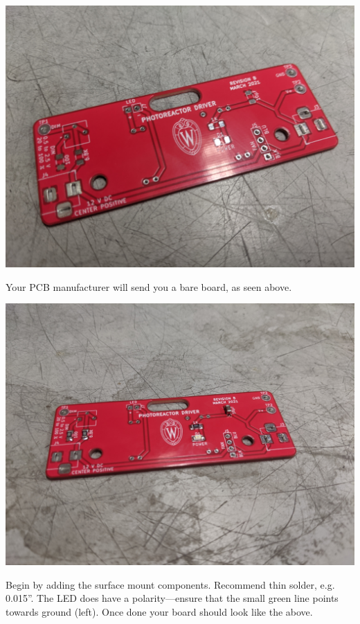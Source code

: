 \documentclass[11pt]{article}
\begin{document}
\begin{center}
  \includegraphics[width=\textwidth/2]{"./bare-pcb.jpg"}
\end{center}

Your PCB manufacturer will send you a bare board, as seen above.

\begin{center}
  \includegraphics[width=\textwidth/2]{"./surface-mount.jpg"}
\end{center}

Begin by adding the surface mount components.
Recommend thin solder, e.g. 0.015''.
The LED does have a polarity---ensure that the small green line points towards ground (left).
Once done your board should look like the above.
\end{document}
